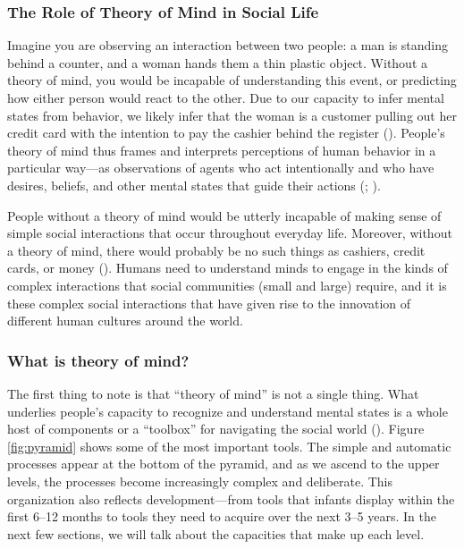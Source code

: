 \documentclass[
]{krantz}
\begin{document}
\subsubsection*{The Role of Theory of Mind in Social Life}\label{the-role-of-theory-of-mind-in-social-life}


Imagine you are observing an interaction between two people: a man is standing behind a counter, and a woman hands them a thin plastic object. Without a theory of mind, you would be incapable of understanding this event, or predicting how either person would react to the other. Due to our capacity to infer mental states from behavior, we likely infer that the woman is a customer pulling out her credit card with the intention to pay the cashier behind the register (). People's theory of mind thus frames and interprets perceptions of human behavior in a particular way---as observations of agents who act intentionally and who have desires, beliefs, and other mental states that guide their actions (; ).

People without a theory of mind would be utterly incapable of making sense of simple social interactions that occur throughout everyday life. Moreover, without a theory of mind, there would probably be no such things as cashiers, credit cards, or money (). Humans need to understand minds to engage in the kinds of complex interactions that social communities (small and large) require, and it is these complex social interactions that have given rise to the innovation of different human cultures around the world.

\subsubsection*{What is theory of mind?}\label{what-is-theory-of-mind}


The first thing to note is that ``theory of mind'' is not a single thing. What underlies people's capacity to recognize and understand mental states is a whole host of components or a ``toolbox'' for navigating the social world (). Figure \ref{fig:pyramid} shows some of the most important tools. The simple and automatic processes appear at the bottom of the pyramid, and as we ascend to the upper levels, the processes become increasingly complex and deliberate. This organization also reflects development---from tools that infants display within the first 6--12 months to tools they need to acquire over the next 3--5 years. In the next few sections, we will talk about the capacities that make up each level.
\end{document}
